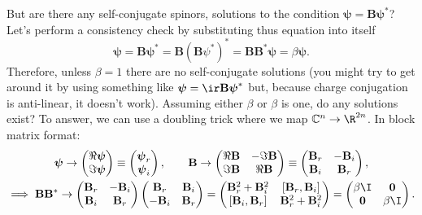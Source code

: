 \documentclass[11pt]{article}
\newcommand{\B}{\mathbf{B}}
\newcommand{\Cb}{\mathbb{C}}
\newcommand{\psib}{\boldsymbol{\psi}}
\begin{document}
But are there any self-conjugate spinors, \ie solutions to the condition \( \psib = \B \psib^\ast \)?
Let's perform a consistency  check by substituting thus equation into itself
%
\begin{equation*}
  \psib = \B \psib^\ast = \B (\B \psi^\ast)^\ast = \B \B^\ast \psib = \beta \psib.
\end{equation*}
%
Therefore, unless $\beta = 1$ there are no self-conjugate solutions
(you might try to get around it by using something like \( \psib = \ir \B \psib^\ast \) but, because charge conjugation is anti-linear, it doesn't work).
Assuming either $\beta$ or $\beta$ is one, do any solutions exist?
To answer, we can use a doubling trick where we map $\Cb^n \to \R^{2n}$.
In block matrix format:
%
\begin{equation*}
\begin{gathered}
  \psib \to \begin{pmatrix}
              \Re \psib \\
              \Im \psib \\
            \end{pmatrix}
  \equiv    \begin{pmatrix}
              \psib_r \\
              \psib_i \\
            \end{pmatrix}
  , \qquad
  \B \to \begin{pmatrix}
           \Re \B & -\Im \B \\
           \Im \B &  \Re \B \\
         \end{pmatrix}
  \equiv \begin{pmatrix}
           \B_r & -\B_i \\
           \B_i &  \B_r \\
         \end{pmatrix}
  , \\
  \implies
  \B \B^\ast \to
         \begin{pmatrix}
           \B_r & -\B_i \\
           \B_i &  \B_r \\
         \end{pmatrix}
         \begin{pmatrix}
            \B_r & \B_i \\
           -\B_i & \B_r \\
         \end{pmatrix}
  =
         \begin{pmatrix}
           \B_r^2 + \B_i^2 & [\B_r, \B_i]    \\
           [\B_i, \B_r]    & \B_r^2 + \B_i^2 \\
         \end{pmatrix}
  =
         \begin{pmatrix}
           \beta \I   & \mathbf{0} \\
           \mathbf{0} & \beta \I   \\
         \end{pmatrix}
  .
\end{gathered}
\end{equation*}
\end{document}
